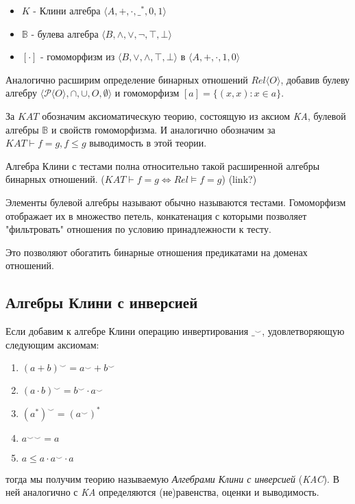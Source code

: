 \documentclass[times
              ]{itmo-student-thesis}
\begin{document}
      \begin{itemize}
        \item $K$ - Клини алгебра $\langle A, +, \cdot, \_^*, 0, 1 \rangle $
        \item $\mathbb{B}$ - булева алгебра $\langle B, \wedge, \vee, \neg, \top, \bot \rangle $
        \item $[\cdot]$ - гомоморфизм из
          $\langle B, \vee, \wedge, \top, \bot \rangle$
        в $\langle A, +,     \cdot, 1,    0 \rangle$
      \end{itemize}

      Аналогично расширим определение бинарных отношений $Rel \langle O \rangle $, добавив булеву алгебру $\langle \mathcal{P}\langle O \rangle, \cap, \cup, O, \emptyset \rangle$ и гомоморфизм $ [a] = \{(x, x): x \in a\} $.

      За $ \mathit{KAT} $ обозначим аксиоматическую теорию, состоящую из аксиом \textit{KA}, булевой алгебры $ \mathbb{B}$ и свойств гомоморфизма. И аналогично обозначим за $ KAT \vdash f = g, f \leq g $ выводимость в этой теории.

      Алгебра Клини с тестами полна относительно такой расширенной алгебры бинарных отношений.
      ($\mathit{KAT} \vdash f = g \Leftrightarrow \mathit{Rel} \models f = g$) (link?)

      Элементы булевой алгебры называют обычно называются тестами.
      Гомоморфизм отображает их в множество петель, конкатенация с которыми позволяет "фильтровать" отношения по условию принадлежности к тесту.

      Это позволяют обогатить бинарные отношения предикатами на доменах отношений.

    \subsection{Алгебры Клини с инверсией}
      Если добавим к алгебре Клини операцию инвертирования $ \_^{\smile} $, удовлетворяющую следующим аксиомам:
      \begin{enumerate}
        \item $ (a + b)^{\smile} = a^{\smile} + b^{\smile} $
        \item $ (a \cdot b)^{\smile} = b^{\smile} \cdot a^{\smile} $
        \item $ (a^*)^{\smile} = (a^{\smile})^* $
        \item $ {a^{\smile}}^{\smile} = a $
        \item $ a \leq a \cdot a^{\smile} \cdot a $
      \end{enumerate}
    тогда мы получим теорию называемую \textit{Алгебрами Клини с инверсией} (\textit{KAC}).
    В ней аналогично с \textit{KA} определяются (не)равенства, оценки и выводимость.
\end{document}

